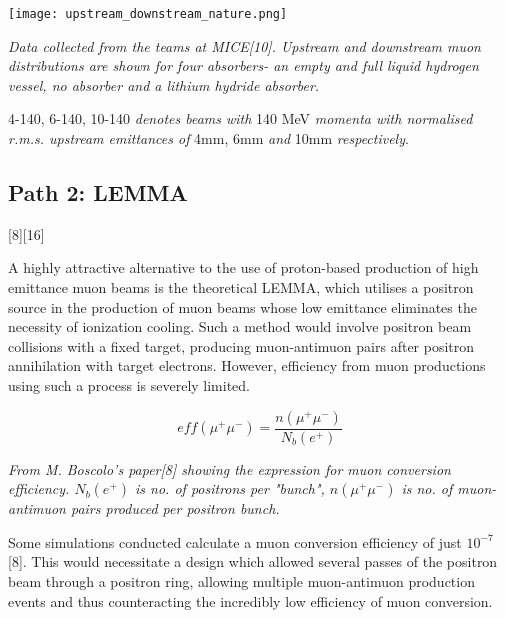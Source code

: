 \documentclass{article}
\begin{document}
	
	
	\begin{center}
		\texttt{[image: upstream\_downstream\_nature.png]}
		\par \textit{Data collected from the teams at MICE[10]. Upstream and downstream muon distributions are shown for four absorbers- an empty and full liquid hydrogen vessel, no absorber and a lithium hydride absorber.}
		\par 4-140, 6-140, 10-140 \textit{denotes beams with} 140 MeV \textit{momenta with normalised r.m.s. upstream emittances of} 4mm, 6mm \textit{and} 10mm \textit{respectively}.
	\end{center}	
	
	
	
	
	
	\subsection{Path 2: LEMMA}[8][16]
	
	\par A highly attractive alternative to the use of proton-based production of high emittance muon beams is the theoretical LEMMA, which utilises a positron source in the production of muon beams whose low emittance eliminates the necessity of ionization cooling. Such a method would involve positron beam collisions with a fixed target, producing muon-antimuon pairs after positron annihilation with target electrons. However, efficiency from muon productions using such a process is severely limited.
	
	$$eff(\mu^+ \mu^-)=\frac{n(\mu^+ \mu^-)}{N_b(e^+)}$$
	
	\begin{center}
		\par \textit{From M. Boscolo's paper[8] showing the expression for muon conversion efficiency. $N_b(e^+)$ is no. of positrons per "bunch", $n(\mu^+ \mu^-)$ is no. of muon-antimuon pairs produced per positron bunch.}
	\end{center}
	
	
	
	\par Some simulations conducted calculate a muon conversion efficiency of just $10^{-7}$[8]. This would necessitate a design which allowed several passes of the positron beam through a positron ring, allowing multiple muon-antimuon production events and thus counteracting the incredibly low efficiency of muon conversion.
	
\end{document}
